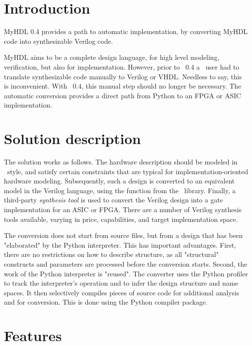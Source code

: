 \section{Introduction\label{conv-intro}}

MyHDL 0.4 provides a path to automatic implementation, by converting
MyHDL code into synthesizable Verilog code.

MyHDL aims to be a complete design language, for high level modeling,
verification, but also for implementation. However, prior to \myhdl\
0.4 a \myhdl\ user had to translate synthesizable code manually to
Verilog or VHDL. Needless to say, this is inconvenient. With \myhdl\
0.4, this manual step should no longer be necessary.  The automatic
conversion provides a direct path from Python to an FPGA or ASIC
implementation.

\section{Solution description\label{conv-solution}}

The solution works as follows. The hardware description should be
modeled in \myhdl\ style, and satisfy certain constraints
that are typical for implementation-oriented hardware modeling.
Subsequently, such a design is converted to an equivalent model in the
Verilog language, using the function \function{toVerilog} 
from the \myhdl\ library. Finally,
a third-party \emph{synthesis tool} is used to convert the Verilog
design into a gate implementation for an ASIC or FPGA. There are a
number of Verilog synthesis tools available, varying in price,
capabilities, and target implementation space.

The conversion does not start from source files, but from a design
that has been "elaborated" by the Python interpreter.  This has
important advantages. First, there are no restrictions on how to
describe structure, as all "structural" constructs and parameters are
processed before the conversion starts. Second, the work of the Python
interpreter is "reused". The converter uses the Python profiler to
track the interpreter's operation and to infer the design structure
and name spaces. It then selectively compiles pieces of source code
for additional analysis and for conversion. This is done using the
Python compiler package.

\section{Features\label{conv-features}}


